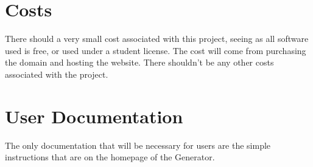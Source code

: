 \documentclass[12pt]{article}
\begin{document}
\section{Costs}
There should a very small cost associated with this project, seeing as all software used is free, or used under a student license. The cost will come from purchasing the domain and hosting the website. There shouldn't be any other costs associated with the project.
\section{User Documentation}
The only documentation that will be necessary for users are the simple instructions that are on the homepage of the Generator. 



\begin{thebibliography}{9}


 
\end{thebibliography}
\end{document}
